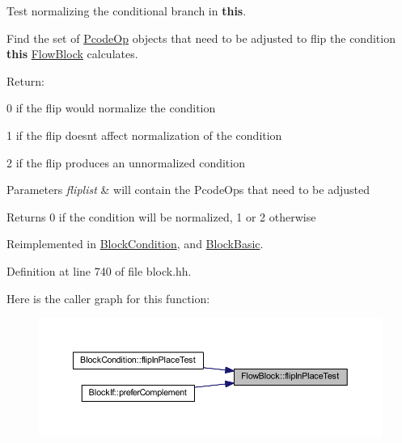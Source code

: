 Test normalizing the conditional branch in {\bfseries{this}}. 

Find the set of \mbox{\hyperlink{class_pcode_op}{Pcode\+Op}} objects that need to be adjusted to flip the condition {\bfseries{this}} \mbox{\hyperlink{class_flow_block}{Flow\+Block}} calculates.

Return\+:
\begin{DoxyItemize}
\item 0 if the flip would normalize the condition
\item 1 if the flip doesn\textquotesingle{}t affect normalization of the condition
\item 2 if the flip produces an unnormalized condition 
\begin{DoxyParams}{Parameters}
{\em fliplist} & will contain the Pcode\+Ops that need to be adjusted \\
\hline
\end{DoxyParams}
\begin{DoxyReturn}{Returns}
0 if the condition will be normalized, 1 or 2 otherwise 
\end{DoxyReturn}

\end{DoxyItemize}

Reimplemented in \mbox{\hyperlink{class_block_condition_a586d47e72963c4e5f719f3673ef3743c}{Block\+Condition}}, and \mbox{\hyperlink{class_block_basic_a7f864c14ab60a19ffb492b86f98f29c7}{Block\+Basic}}.



Definition at line 740 of file block.\+hh.

Here is the caller graph for this function\+:
\nopagebreak
\begin{figure}[H]
\begin{center}
\leavevmode
\includegraphics[width=350pt]{class_flow_block_a09019e2e4104844e1a698ccf72560bef_icgraph}
\end{center}
\end{figure}
\mbox{\label{class_flow_block_a40e35da1a06856a7f9a8af381c3e3261}} 
